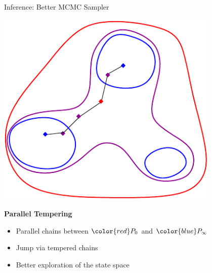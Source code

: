 \documentclass{beamer}
\begin{document}
\begin{frame}{Inference: Better MCMC Sampler}
\begin{minipage}{0.4\textwidth}
\centering
\includegraphics[width=0.8\textwidth]{pt.pdf}
\end{minipage}
\begin{minipage}{0.58\textwidth}
{\bf Parallel Tempering}
\begin{itemize}
\item Parallel chains between $\color{red}P_0$ and $\color{blue}P_{\infty}$
\item Jump via tempered chains
\item Better exploration of the state space
\end{itemize}
\end{minipage}

\end{frame}
\end{document}
